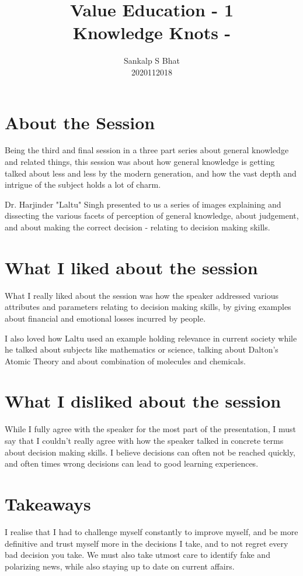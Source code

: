 \documentclass[a4paper, 12pt]{extarticle}
\title{Value Education - 1\\
Knowledge Knots - \uppercase\expandafter{\romannumeral3\relax}}
\author{Sankalp S Bhat\\
2020112018
}
\begin{document}
\maketitle
\thispagestyle{empty}

\section*{About the Session}
Being the third and final session in a three part series about general knowledge and related things, this session was about how general knowledge is getting talked about less and less by the modern generation, and how the vast depth and intrigue of the subject holds a lot of charm.

Dr. Harjinder "Laltu" Singh presented to us a series of images explaining and dissecting the various facets of perception of general knowledge, about judgement, and about making the correct decision - relating to decision making skills.
      
\section*{What I liked about the session}

What I really liked about the session was how the speaker addressed various attributes and parameters relating to decision making skills, by giving examples about financial and emotional losses incurred by people.
    
I also loved how Laltu used an example holding relevance in current society while he talked about subjects like mathematics or science, talking about Dalton's Atomic Theory and about combination of molecules and chemicals.

 \section*{What I disliked about the session}
 
While I fully agree with the speaker for the most part of the presentation, I must say that I couldn't really agree with how the speaker talked in concrete terms about decision making skills. I believe decisions can often not be reached quickly, and often times wrong decisions can lead to good learning experiences.

\section*{Takeaways}
    
I realise that I had to challenge myself constantly to improve myself, and be more definitive and trust myself more in the decisions I take, and to not regret every bad decision you take. We must also take utmost care to identify fake and polarizing news, while also staying up to date on current affairs.
\end{document}
